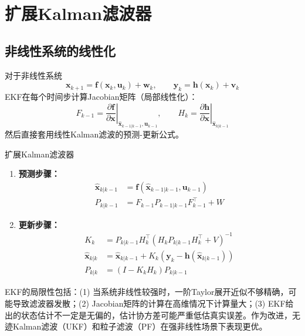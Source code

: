 \section{扩展Kalman滤波器}

\subsection{非线性系统的线性化}

对于非线性系统
\[
\mathbf{x}_{k+1} = \mathbf{f}(\mathbf{x}_k, \mathbf{u}_k) + \mathbf{w}_k,\qquad
\mathbf{y}_k = \mathbf{h}(\mathbf{x}_k) + \mathbf{v}_k
\]
EKF在每个时间步计算Jacobian矩阵（局部线性化）：
\[
F_{k-1} = \left.\frac{\partial \mathbf{f}}{\partial \mathbf{x}}\right|_{\hat{\mathbf{x}}_{k-1|k-1}, \mathbf{u}_{k-1}},\qquad
H_k = \left.\frac{\partial \mathbf{h}}{\partial \mathbf{x}}\right|_{\hat{\mathbf{x}}_{k|k-1}}
\]
然后直接套用线性Kalman滤波的预测-更新公式。

\begin{myalgorithm}{扩展Kalman滤波器}
\begin{enumerate}
\item \textbf{预测步骤：}
\begin{align*}
\hat{\mathbf{x}}_{k|k-1} &= \mathbf{f}(\hat{\mathbf{x}}_{k-1|k-1}, \mathbf{u}_{k-1}) \\
P_{k|k-1} &= F_{k-1} P_{k-1|k-1} F_{k-1}^{\top} + W
\end{align*}
\item \textbf{更新步骤：}
\begin{align*}
K_k &= P_{k|k-1} H_k^{\top}(H_k P_{k|k-1} H_k^{\top} + V)^{-1} \\
\hat{\mathbf{x}}_{k|k} &= \hat{\mathbf{x}}_{k|k-1} + K_k(\mathbf{y}_k - \mathbf{h}(\hat{\mathbf{x}}_{k|k-1})) \\
P_{k|k} &= (I - K_k H_k)P_{k|k-1}
\end{align*}
\end{enumerate}
\end{myalgorithm}

\begin{remark}
EKF的局限性包括：(1) 当系统非线性较强时，一阶Taylor展开近似不够精确，可能导致滤波器发散；(2) Jacobian矩阵的计算在高维情况下计算量大；(3) EKF给出的状态估计不一定是无偏的，估计协方差可能严重低估真实误差。作为改进，无迹Kalman滤波（UKF）和粒子滤波（PF）在强非线性场景下表现更优。
\end{remark}

